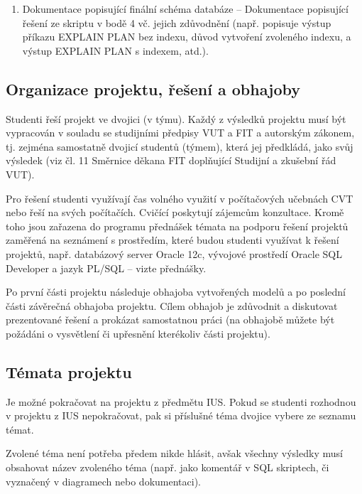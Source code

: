 \documentclass[11pt, a4paper, titlepage]{article}
\begin{document}
\begin{enumerate}
	\item Dokumentace popisující finální schéma databáze – Dokumentace popisující řešení ze skriptu v bodě 4 vč. jejich zdůvodnění (např. popisuje výstup příkazu EXPLAIN PLAN bez indexu, důvod vytvoření zvoleného indexu, a výstup EXPLAIN PLAN s indexem, atd.).
\end{enumerate}
\medskip


\subsection*{Organizace projektu, řešení a obhajoby}

Studenti řeší projekt ve dvojici (v týmu). Každý z výsledků projektu musí být vypracován v souladu se studijními předpisy VUT a FIT a autorským zákonem, tj. zejména samostatně dvojicí studentů (týmem), která jej předkládá, jako svůj výsledek (viz čl. 11 Směrnice děkana FIT doplňující Studijní a zkušební řád VUT).
\medskip

Pro řešení studenti využívají čas volného využití v počítačových učebnách CVT nebo řeší na svých počítačích. Cvičící poskytují zájemcům konzultace. Kromě toho jsou zařazena do programu přednášek témata na podporu řešení projektů zaměřená na seznámení s prostředím, které budou studenti využívat k řešení projektů, např. databázový server Oracle 12c, vývojové prostředí Oracle SQL Developer a jazyk PL/SQL – vizte přednášky.
\medskip

Po první části projektu následuje obhajoba vytvořených modelů a po poslední části závěrečná obhajoba projektu. Cílem obhajob je zdůvodnit a diskutovat prezentované řešení a prokázat samostatnou práci (na obhajobě můžete být požádáni o vysvětlení či upřesnění kterékoliv části projektu).
\medskip


\subsection*{Témata projektu}

Je možné pokračovat na projektu z předmětu IUS. Pokud se studenti rozhodnou v projektu z IUS nepokračovat, pak si příslušné téma dvojice vybere ze seznamu témat.
\medskip

Zvolené téma není potřeba předem nikde hlásit, avšak všechny výsledky musí obsahovat název zvoleného téma (např. jako komentář v SQL skriptech, či vyznačený v diagramech nebo dokumentaci).
\medskip
\end{document}
